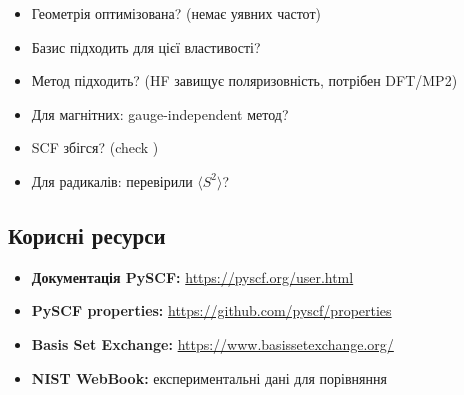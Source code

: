 \begin{itemize}
    \item Геометрія оптимізована? (немає уявних частот)
    \item Базис підходить для цієї властивості?
    \item Метод підходить? (HF завищує поляризовність, потрібен DFT/MP2)
    \item Для магнітних: gauge-independent метод?
    \item SCF збігся? (check )
    \item Для радикалів: перевірили $\langle S^2 \rangle$?
\end{itemize}

\subsection*{Корисні ресурси}

\begin{itemize}
    \item \textbf{Документація PySCF:} \url{https://pyscf.org/user.html}
    \item \textbf{PySCF properties:} \url{https://github.com/pyscf/properties}
    \item \textbf{Basis Set Exchange:} \url{https://www.basissetexchange.org/}
    \item \textbf{NIST WebBook:} експериментальні дані для порівняння
\end{itemize}



%
%
%
